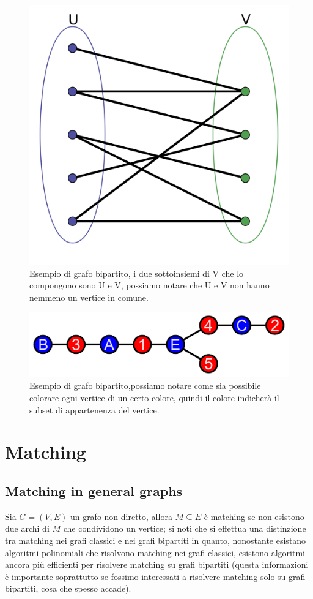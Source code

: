 \documentclass[12pt,a4paper]{article}
\begin{document}
\begin{figure}[h]
	\centering
	\includegraphics[width=0.6\linewidth]{img/bipartite-graph.png}
	\caption{Esempio di grafo bipartito, i due sottoinsiemi di V che lo compongono sono U e V, possiamo notare che U e V non hanno nemmeno un vertice in comune.}
	\label{fig:Esempio di grafo bipartito}
\end{figure}
\begin{figure}[h]
	\centering
	\includegraphics[width=0.6\linewidth]{img/Bipart_graph_no_cross.svg.png}
	\caption{Esempio di grafo bipartito,possiamo notare come sia possibile colorare ogni vertice di un certo colore, quindi il colore indicherà il subset di appartenenza del vertice.}
	\label{fig:Esempio di grafo bipartito senza incroci}
\end{figure}

\section{Matching}

\subsection{Matching in general graphs}
Sia $G = (V, E)$ un grafo non diretto, allora $M \subseteq E$ è matching se non esistono due archi di $M$ che condividono un vertice; si noti che si effettua una distinzione tra matching nei grafi classici e nei grafi bipartiti in quanto, nonostante esistano algoritmi polinomiali che risolvono matching nei grafi classici, esistono algoritmi ancora più efficienti per risolvere matching su grafi bipartiti (questa informazioni è importante soprattutto se fossimo interessati a risolvere matching solo su grafi bipartiti, cosa che spesso accade).
\end{document}
